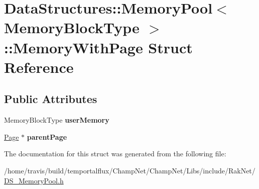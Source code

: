 \hypertarget{struct_data_structures_1_1_memory_pool_1_1_memory_with_page}{\section{Data\-Structures\-:\-:Memory\-Pool$<$ Memory\-Block\-Type $>$\-:\-:Memory\-With\-Page Struct Reference}
\label{struct_data_structures_1_1_memory_pool_1_1_memory_with_page}
}
\subsection*{Public Attributes}
\begin{DoxyCompactItemize}
\item 
\hypertarget{struct_data_structures_1_1_memory_pool_1_1_memory_with_page_a902bbfa65d6739852765aecdcbc22d1c}{Memory\-Block\-Type {\bfseries user\-Memory}}\label{struct_data_structures_1_1_memory_pool_1_1_memory_with_page_a902bbfa65d6739852765aecdcbc22d1c}

\item 
\hypertarget{struct_data_structures_1_1_memory_pool_1_1_memory_with_page_afa328289bc2f4c78bd2c45de32e3a31e}{\hyperlink{struct_data_structures_1_1_memory_pool_1_1_page}{Page} $\ast$ {\bfseries parent\-Page}}\label{struct_data_structures_1_1_memory_pool_1_1_memory_with_page_afa328289bc2f4c78bd2c45de32e3a31e}

\end{DoxyCompactItemize}


The documentation for this struct was generated from the following file\-:\begin{DoxyCompactItemize}
\item 
/home/travis/build/temportalflux/\-Champ\-Net/\-Champ\-Net/\-Libs/include/\-Rak\-Net/\hyperlink{_d_s___memory_pool_8h}{D\-S\-\_\-\-Memory\-Pool.\-h}\end{DoxyCompactItemize}
